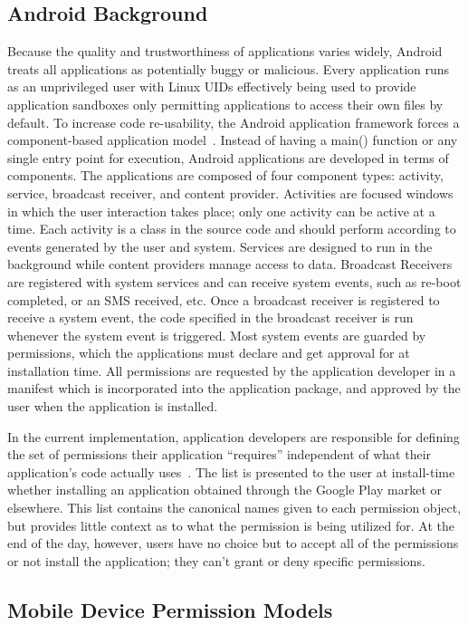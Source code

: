 \subsection{Android Background}
Because the quality and trustworthiness of applications varies widely, Android treats all applications as potentially buggy or malicious.  Every application runs as an unprivileged user with Linux UIDs effectively being used to provide application sandboxes only permitting applications to access their own files by default.  To increase code re-usability, the Android application framework forces a component-based application model~\cite{4768655}.  Instead of having a main() function or any single entry point for execution, Android applications are developed in terms of components.  The applications are composed of four component types:  activity, service, broadcast receiver, and content provider.  Activities are focused windows in which the user interaction takes place; only one activity can be active at a time.  Each activity is a class in the source code and should perform according to events generated by the user and system.  Services are designed to run in the background while content providers manage access to data.  Broadcast Receivers are registered with system services and can receive system events, such as re-boot completed, or an SMS received, etc.  Once a broadcast receiver is registered to receive a system event, the code specified in the broadcast receiver is run whenever the system event is triggered.  Most system events are guarded by permissions, which the applications must declare and get approval for at installation time.  All permissions are requested by the application developer in a manifest which is incorporated into the application package, and approved by the user when the application is installed.  

In the current implementation, application developers are responsible for defining the set of permissions their application “requires” independent of what their application’s code actually uses~\cite{Felt}.  The list is presented to the user at install-time whether installing an application obtained through the Google Play market or elsewhere.  This list contains the canonical names given to each permission object, but provides little context as to what the permission is being utilized for.  At the end of the day, however, users have no choice but to accept all of the permissions or not install the application; they can't grant or deny specific permissions.  

\subsection{Mobile Device Permission Models}


